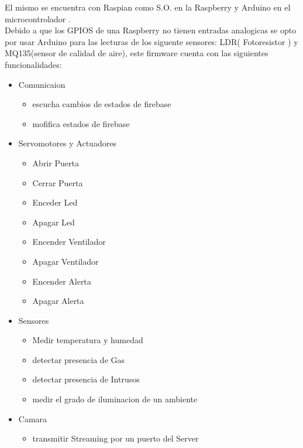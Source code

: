 \documentclass[letterpaper,12pt]{article}
\begin{document}
{		El mismo se encuentra con Raspian como S.O.  en la Raspberry  y Arduino en el microcontrolador .\\
		
		Debido a que los GPIOS de una Raspberry no tienen entradas analogicas se opto por usar Arduino para las lecturas de los siguente sensores: LDR( Fotoresistor ) y MQ135(sensor  de calidad de aire), este firmware  cuenta con las siguientes funcionalidades:
		
		\begin{itemize}
			\item Comunicaion
			\begin{itemize}
				\item escucha cambios de estados de firebase
				\item mofifica estados de firebase
			\end{itemize}
			
			\item Servomotores y Actuadores 
			\begin{itemize}
				\item Abrir Puerta
				\item Cerrar Puerta
				\item Enceder Led
				\item Apagar Led
				\item Encender Ventilador
				\item Apagar Ventilador
				\item Encender Alerta
				\item Apagar Alerta
			\end{itemize}
			\item Sensores
			\begin{itemize}
				\item Medir temperatura y humedad
				\item detectar presencia de Gas
				\item detectar presencia de Intrusos
				\item medir el grado de iluminacion de un ambiente
				
			\end{itemize}
			\item Camara	
			\begin{itemize}
				\item transmitir Streaming por un puerto del Server
			\end{itemize}
			
		\end{itemize}
		
}
\end{document}
